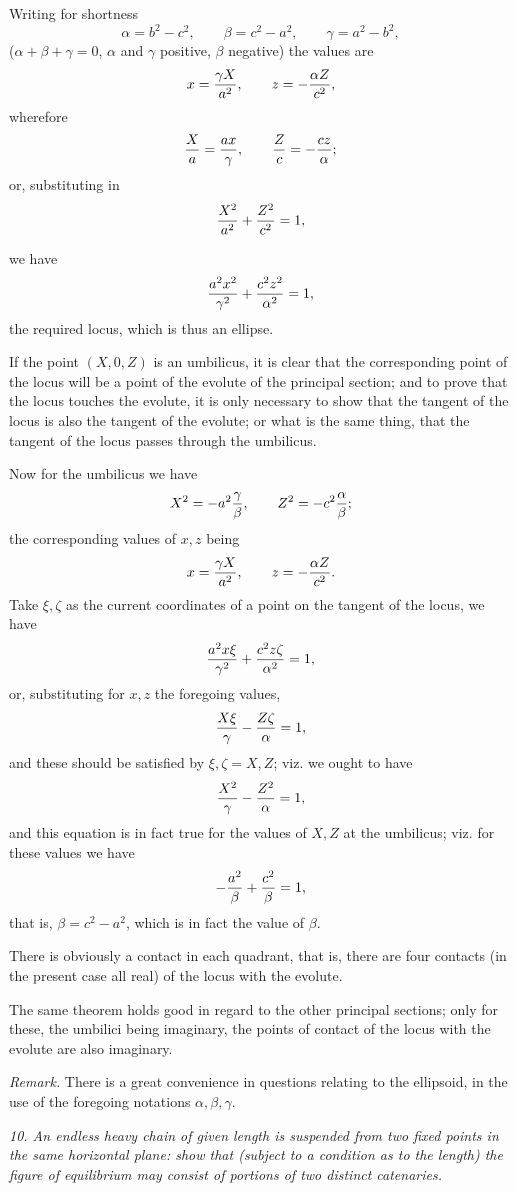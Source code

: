 \documentclass[11pt,a4paper]{article}
\theoremstyle{plain}
\theoremstyle{definition}
\begin{document}
Writing for shortness
\[
\alpha=b^2-c^2,\qquad \beta=c^2-a^2,\qquad \gamma=a^2-b^2,
\]
($\alpha+\beta+\gamma=0$, $\alpha$ and $\gamma$ positive, $\beta$ negative) the values are
\[
x={\gamma X\over a^2},\qquad z=-{\alpha Z\over c^2},
\]
wherefore
\[
{X\over a}={ax\over \gamma},\qquad {Z\over c}=-{cz\over\alpha};
\]
or, substituting in
\[
{X^2\over a^2}+{Z^2\over c^2}=1,
\]

\newpage

we have
\[
{a^2x^2\over \gamma^2}+{c^2z^2\over \alpha^2}=1,
\]
the required locus, which is thus an ellipse.

If the point $(X,0,Z)$ is an umbilicus, it is clear that the corresponding point of the locus will be a point of the evolute of the principal section; and to prove that the locus touches the evolute, it is only necessary to show that the tangent of the locus is also the tangent of the evolute; or what is the same thing, that the tangent of the locus passes through the umbilicus.

Now for the umbilicus we have
\[
X^2=-a^2{\gamma\over\beta},\qquad Z^2=-c^2{\alpha\over\beta};
\]
the corresponding values of $x,z$ being
\[
x={\gamma X\over a^2},\qquad z=-{\alpha Z\over c^2}.
\]
Take $\xi,\zeta$ as the current coordinates of a point on the tangent of the locus, we have
\[
{a^2x\xi\over\gamma^2}+{c^2z\zeta\over\alpha^2}=1,
\]
or, substituting for $x,z$ the foregoing values,
\[
{X\xi\over\gamma}-{Z\zeta\over\alpha}=1,
\]
and these should be satisfied by $\xi,\zeta=X,Z$; viz. we ought to have
\[
{X^2\over\gamma}-{Z^2\over\alpha}=1,
\]
and this equation is in fact true for the values of $X,Z$ at the umbilicus; viz. for these values we have
\[
-{a^2\over\beta}+{c^2\over\beta}=1,
\]
that is, $\beta=c^2-a^2$, which is in fact the value of $\beta$.

There is obviously a contact in each quadrant, that is, there are four contacts (in the present case all real) of the locus with the evolute.

The same theorem holds good in regard to the other principal sections; only for these, the umbilici being imaginary, the points of contact of the locus with the evolute are also imaginary.

\textit{Remark.} There is a great convenience in questions relating to the ellipsoid, in the use of the foregoing notations $\alpha,\beta,\gamma$.

\newpage

\noindent\textit{10. An endless heavy chain of given length is suspended from two fixed points in the same horizontal plane: show that (subject to a condition as to the length) the figure of equilibrium may consist of portions of two distinct catenaries.}
\end{document}
